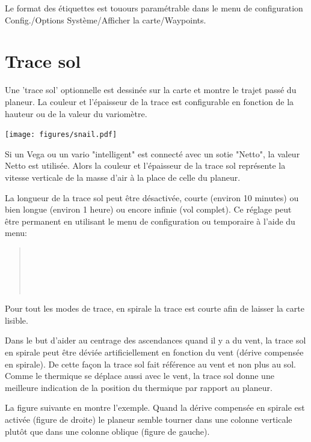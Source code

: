 Le format des étiquettes est touours paramétrable dans le menu de configuration Config./Options Système/Afficher la carte/Waypoints.

\section{Trace sol}\label{sec:trail}

Une 'trace sol' optionnelle est dessinée sur la carte et montre le trajet passé du planeur. La couleur et l'épaisseur de la trace est configurable en fonction de la hauteur ou de la valeur du variomètre. 

\begin{center}
\texttt{[image: figures/snail.pdf]}
\end{center}

Si un Vega ou un vario "intelligent" est connecté avec un sotie "Netto", la valeur Netto est utilisée. Alors la couleur et l'épaisseur de la trace sol représente la vitesse verticale de la masse d'air à la place de celle du planeur.

La longueur de la trace sol peut être désactivée, courte (environ 10 minutes) ou bien longue (environ 1 heure) ou encore infinie (vol complet). Ce réglage peut être permanent en utilisant le menu de configuration  ou temporaire à l'aide du menu:
\begin{quote}
\blink{} \\
\blink{} \\
\blink{} \\
\blink{} \\
\blink{}
\end{quote}

Pour tout les modes de trace, en spirale la trace est courte afin de laisser la carte lisible.

Dans le but d'aider au centrage des ascendances quand il y a du vent, la trace sol en spirale peut être déviée artificiellement en fonction du vent (dérive compensée en spirale). De cette façon la trace sol fait référence au vent et non plus au sol. Comme le thermique se déplace aussi avec le vent, la trace sol donne une meilleure indication de la position du thermique par rapport au planeur.

La figure suivante en montre l'exemple. Quand la dérive compensée en spirale est activée (figure de droite) le planeur semble tourner dans une colonne verticale plutôt que dans une colonne oblique (figure de gauche).

